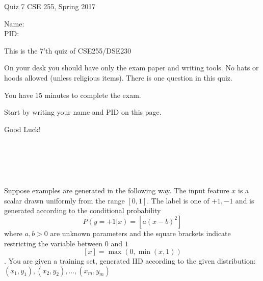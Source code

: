 \documentclass[10pt]{article}
\begin{document}
\setlength\parindent{0pt}
\thispagestyle{empty}

{\textbf \Large Quiz 7} \hfill CSE 255, Spring 2017
\\

\vspace{.1in}

Name: \underline{\hspace{3in}}
\\

PID: \underline{\hspace{3.15in}}

\vspace{.1in}

{\small \setlength\parindent{20pt}This is the 7'th quiz of CSE255/DSE230

On your desk you should have only the exam paper and writing tools.
No hats or hoods allowed (unless religious items).
There is one question in this quiz.

You have 15 minutes to complete the exam.

Start by writing your name and PID on this page.

Good Luck!}\\
\underline{\hspace{6in}}

~\\
~\\
\noindent

   Suppose examples are generated in the following way. The input
   feature $x$ is a scalar drawn uniformly from the range
   $[0,1]$. The label is one of ${+1,-1}$ and is generated
   according to the conditional probability
   $$P(y=+1 | x) = \left[a (x-b)^2\right]$$ where $a,b>0$ are unknown
   parameters and the square
   brackets indicate restricting the variable between $0$ and $1$
   $$[x] = \max(0,\min(x,1))$$. You are given a training set,
   generated IID according to the given distribution:
   $(x_1,y_1),(x_2,y_2),\ldots,(x_m,y_m)$
\end{document}
